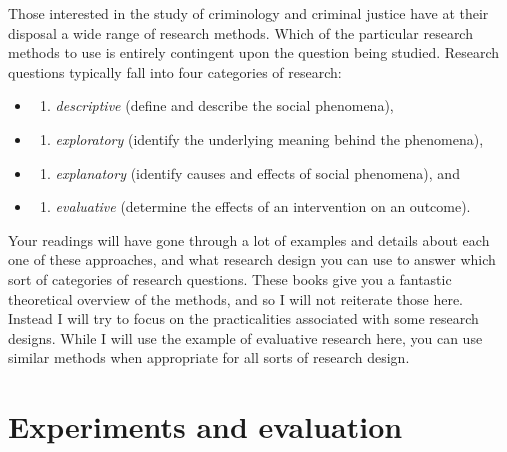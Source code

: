\documentclass[]{book}
\providecommand{\tightlist}{%
  \setlength{\itemsep}{0pt}\setlength{\parskip}{0pt}}
\theoremstyle{definition}
\theoremstyle{definition}
\theoremstyle{definition}
\theoremstyle{remark}
\begin{document}
Those interested in the study of criminology and criminal justice have
at their disposal a wide range of research methods. Which of the
particular research methods to use is entirely contingent upon the
question being studied. Research questions typically fall into four
categories of research:

\begin{itemize}
\item
  \begin{enumerate}
  \def\labelenumi{(\arabic{enumi})}
  \tightlist
  \item
    \emph{descriptive} (define and describe the social phenomena),
  \end{enumerate}
\item
  \begin{enumerate}
  \def\labelenumi{(\arabic{enumi})}
  \setcounter{enumi}{1}
  \tightlist
  \item
    \emph{exploratory} (identify the underlying meaning behind the
    phenomena),
  \end{enumerate}
\item
  \begin{enumerate}
  \def\labelenumi{(\arabic{enumi})}
  \setcounter{enumi}{2}
  \tightlist
  \item
    \emph{explanatory} (identify causes and effects of social
    phenomena), and
  \end{enumerate}
\item
  \begin{enumerate}
  \def\labelenumi{(\arabic{enumi})}
  \setcounter{enumi}{3}
  \tightlist
  \item
    \emph{evaluative} (determine the effects of an intervention on an
    outcome).
  \end{enumerate}
\end{itemize}

Your readings will have gone through a lot of examples and details about
each one of these approaches, and what research design you can use to
answer which sort of categories of research questions. These books give
you a fantastic theoretical overview of the methods, and so I will not
reiterate those here. Instead I will try to focus on the practicalities
associated with some research designs. While I will use the example of
evaluative research here, you can use similar methods when appropriate
for all sorts of research design.

\hypertarget{experiments-and-evaluation}{%
\section{Experiments and evaluation}\label{experiments-and-evaluation}}
\end{document}
